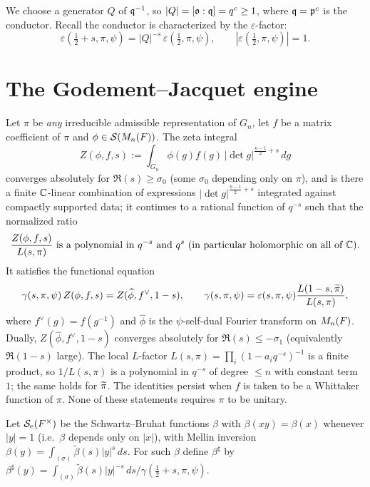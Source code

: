 We choose a generator $Q$ of $\mathfrak{q}^{-1}$, so $|Q|=[\mathfrak{o}:\mathfrak{q}]=q^{c}\ge1$, where
$\mathfrak{q}=\mathfrak{p}^{c}$ is the conductor. Recall the
conductor is characterized by the $\varepsilon$-factor:
\begin{equation}\label{eq:eps}
\varepsilon(\tfrac12+s,\pi,\psi)=|Q|^{-s}\,\varepsilon(\tfrac12,\pi,\psi),
\qquad |\varepsilon(\tfrac12,\pi,\psi)|=1 .
\end{equation}

\section*{The Godement--Jacquet engine}

\begin{qtwolemma}\label{lem:GJ}
Let $\pi$ be \emph{any} irreducible admissible representation of $G_n$, let $f$ be a matrix
coefficient of $\pi$ and $\phi\in\mathcal{S}(M_n(F))$. The zeta integral
\[
Z(\phi,f,s):=\int_{G_n}\phi(g)f(g)\,|\det g|^{\frac{n-1}{2}+s}\,dg
\]
converges absolutely for $\Re(s)\ge\sigma_0$ \textup{(}some $\sigma_0$ depending only on
$\pi$\textup{)}, and is there a finite $\mathbb{C}$-linear combination of expressions
$|\det g|^{\frac{n-1}{2}+s}$ integrated against compactly supported data; it continues to a
rational function of $q^{-s}$ such that the normalized ratio
\[
\frac{Z(\phi,f,s)}{L(s,\pi)}\ \text{is a polynomial in }q^{-s}\text{ and }q^{s}
\ \text{\textup{(}in particular holomorphic on all of }\mathbb{C}\text{\textup{)}.}
\]
It satisfies the functional equation
\[
\gamma(s,\pi,\psi)\,Z(\phi,f,s)=Z(\widehat\phi,f^\vee,1-s),\qquad
\gamma(s,\pi,\psi)=\varepsilon(s,\pi,\psi)\frac{L(1-s,\widetilde{\pi})}{L(s,\pi)},
\]
where $f^\vee(g)=f(g^{-1})$ and $\widehat\phi$ is the $\psi$-self-dual Fourier
transform on $M_n(F)$. Dually, $Z(\widehat\phi,f^\vee,1-s)$ converges absolutely for
$\Re(s)\le-\sigma_1$ \textup{(}equivalently $\Re(1-s)$ large\textup{)}. The local $L$-factor
$L(s,\pi)=\prod_i(1-a_iq^{-s})^{-1}$ is a finite product, so $1/L(s,\pi)$ is a polynomial in
$q^{-s}$ of degree $\le n$ with constant term $1$; the same holds for $\widetilde{\pi}$. The
identities persist when $f$ is taken to be a Whittaker function of $\pi$. None of these
statements requires $\pi$ to be unitary.
\end{qtwolemma}

Let $\mathcal{S}_{\mathrm e}(F^\times)$ be the Schwartz--Bruhat functions $\beta$ with
$\beta(xy)=\beta(x)$ whenever $|y|=1$ (i.e.\ $\beta$ depends only on $|x|$),
with Mellin inversion $\beta(y)=\int_{(\sigma)}\tilde\beta(s)|y|^s\,ds$. For such
$\beta$ define $\beta^\sharp$ by
$\beta^\sharp(y)=\int_{(\sigma)}\tilde\beta(s)|y|^{-s}\,ds/\gamma(\tfrac12+s,\pi,\psi)$.

